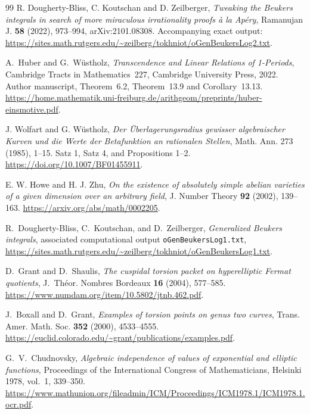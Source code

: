 \documentclass[11pt,a4paper]{article}
\theoremstyle{definition}
\theoremstyle{remark}
\numberwithin{equation}{section}
\begin{document}
\clearpage
{}
\begin{thebibliography}{99}
R. Dougherty-Bliss, C. Koutschan and D. Zeilberger,
\emph{Tweaking the Beukers integrals in search of more miraculous
irrationality proofs \`a la Ap\'ery}, Ramanujan J. \textbf{58} (2022),
973--994, arXiv:2101.08308.
Accompanying exact output:
\url{https://sites.math.rutgers.edu/~zeilberg/tokhniot/oGenBeukersLog2.txt}.

A.~Huber and G.~W\"ustholz,
\emph{Transcendence and Linear Relations of 1-Periods},
Cambridge Tracts in Mathematics~227, Cambridge University Press, 2022.
Author manuscript, Theorem~6.2, Theorem~13.9 and Corollary~13.13.
\url{https://home.mathematik.uni-freiburg.de/arithgeom/preprints/huber-einsmotive.pdf}.

J. Wolfart and G. W\"ustholz,
\emph{Der \"Uberlagerungsradius gewisser algebraischer Kurven und die Werte
der Betafunktion an rationalen Stellen}, Math. Ann. 273 (1985), 1--15.
Satz 1, Satz 4, and Propositions 1--2.
\url{https://doi.org/10.1007/BF01455911}.

E. W. Howe and H. J. Zhu,
\emph{On the existence of absolutely simple abelian varieties of a
given dimension over an arbitrary field},
J. Number Theory \textbf{92} (2002), 139--163.
\url{https://arxiv.org/abs/math/0002205}.

R.~Dougherty-Bliss, C.~Koutschan, and D.~Zeilberger,
\emph{Generalized Beukers integrals}, associated computational output
\texttt{oGenBeukersLog1.txt},
\url{https://sites.math.rutgers.edu/~zeilberg/tokhniot/oGenBeukersLog1.txt}.

D.~Grant and D.~Shaulis,
\emph{The cuspidal torsion packet on hyperelliptic Fermat quotients},
J.~Th\'eor. Nombres Bordeaux \textbf{16} (2004), 577--585.
\url{https://www.numdam.org/item/10.5802/jtnb.462.pdf}.

J.~Boxall and D.~Grant,
\emph{Examples of torsion points on genus two curves},
Trans. Amer. Math. Soc. \textbf{352} (2000), 4533--4555.
\url{https://euclid.colorado.edu/~grant/publications/examples.pdf}.

G.~V.~Chudnovsky,
\emph{Algebraic independence of values of exponential and elliptic
functions}, Proceedings of the International Congress of Mathematicians,
Helsinki 1978, vol.~1, 339--350.
\url{https://www.mathunion.org/fileadmin/ICM/Proceedings/ICM1978.1/ICM1978.1.ocr.pdf}.


\end{thebibliography}
\end{document}
